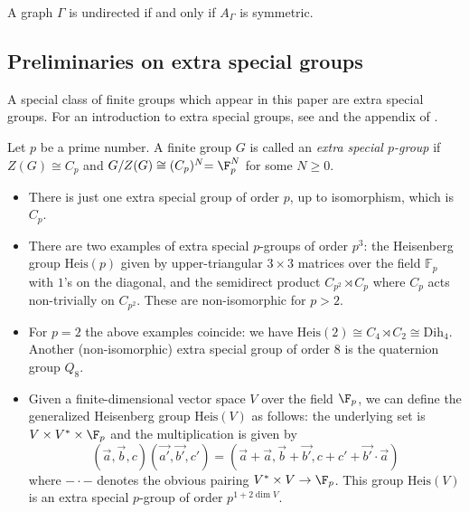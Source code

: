 \begin{rema}
 A graph $\Gamma$ is undirected if and only if $A_{\Gamma}$ is symmetric.
\end{rema}



\subsection{Preliminaries on extra special groups}\label{ssec:extra_special}
A special class of finite groups which appear in this paper are extra special groups. For an introduction to extra special groups, see \cite{Aschbacher} and the appendix of \cite{Diaconis}.

\begin{defi}
 Let $p$ be a prime number. A finite group $G$ is called an {\it extra special $p$-group} if $Z(G) \cong C_p$ and $G/Z(G) \cong (C_p)^N {= \F_p^N}$ for some $N\geq 0$. 
\end{defi}
\begin{exam}\label{ex:extra_special_groups}
\mbox{}
\begin{itemize}
 \item There is just one extra special group of order $p$, up to isomorphism, which is~$C_p$. 
 \item There are two examples of extra special $p$-groups of order $p^3$: the 
Heisenberg group $\mathrm{Heis}(p)$ given by upper-triangular $3\times 3$ matrices over the field 
$\mathbb{F}_p$ with $1$'s on the diagonal, and the semidirect product $C_{p^2} 
\rtimes C_p$ where $C_p$ acts non-trivially on $C_{p^2}$. These are non-isomorphic for $p>2$. 
 \item For $p=2$ the above examples coincide: we have $\mathrm{Heis}(2)\cong C_4 \rtimes C_2 \cong \mathrm{Dih}_4$. Another (non-isomorphic) extra special group of 
order $8$ is the quaternion group $Q_8$.
 \item Given a finite-dimensional vector space $V$ over the field $\F_p$, we can 
define the generalized Heisenberg group $\mathrm{Heis}(V)$ as follows: the underlying set 
is $V \times V^* \times \F_p$ and the multiplication is given by $$(\vec{a}, 
\vec{b}, c)(\vec{a'}, \vec{b'}, c') = (\vec{a} +\vec{a}, \vec{b}+\vec{b'}, c + 
c' + \vec{b'}\cdot\vec{a})$$ where $-\cdot -$ denotes the obvious pairing $V^* 
\times V \to \F_p$. This group $\mathrm{Heis}(V)$ is an extra special $p$-group of order 
$p^{1+2\dim V}$.
\end{itemize}

 
\end{exam}

